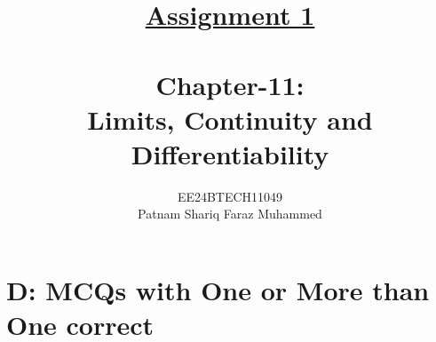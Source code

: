 \documentclass[journal,12pt,twocolumn]{IEEEtran}
\theoremstyle{remark}
\renewcommand{\thefigure}{\theenumi}
\renewcommand{\thetable}{\theenumi}
\begin{document}


\title{{\uline{Assignment 1 \\ } \\}Chapter-11: \\Limits, Continuity and Differentiability}
\author{{EE24BTECH11049 \\ Patnam Shariq Faraz Muhammed}}


 
\maketitle
\newpage
\bigskip

\renewcommand{\thefigure}{\theenumi}
\renewcommand{\thetable}{\theenumi}

\section*{D: MCQs with One or More than One correct}
\end{document}
